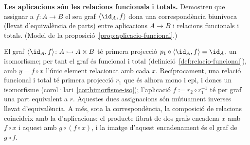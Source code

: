 \begin{exercici}
\textbf{Les aplicacions són les relacions funcionals i totals.} Demostreu que assignar a \(f\colon A\to B\) el seu graf \(\langle\id_A,f\rangle\) dona una correspondència biunívoca (llevat d'equivalència de parts) entre aplicacions \(A\to B\) i relacions funcionals i totals. (Model de la proposició~\ref{prop:aplicacio-funcional}.)
\end{exercici}
\begin{solucio}
El graf \(\langle\id_A,f\rangle\colon A\rightarrowtail A\times B\) té primera projecció \(p_1\circ\langle\id_A,f\rangle=\id_A\), un isomorfisme; per tant el graf és funcional i total (definició~\ref{def:relacio-funcional}), amb \(y=f\circ x\) l'únic element relacionat amb cada \(x\). Recíprocament, una relació funcional i total té primera projecció \(r_1\) que és alhora mono i epi, i doncs un isomorfisme (corol·lari~\ref{cor:bimorfisme-iso}); l'aplicació \(f:=r_2\circ r_1^{-1}\) té per graf una part equivalent a \(r\). Aquestes dues assignacions són mútuament inverses llevat d'equivalència. A més, sota la correspondència, la composició de relacions coincideix amb la d'aplicacions: el producte fibrat de dos grafs encadena \(x\) amb \(f\circ x\) i aquest amb \(g\circ(f\circ x)\), i la imatge d'aquest encadenament és el graf de \(g\circ f\).
\end{solucio}
